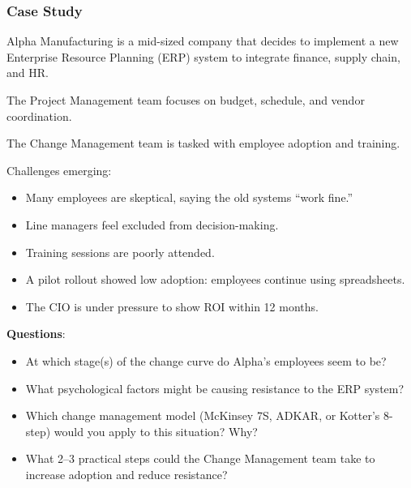 \subsubsection{Case Study}

\indent 

Alpha Manufacturing is a mid-sized company that decides to implement a new Enterprise Resource Planning (ERP) system to integrate finance, supply chain, and HR.

The Project Management team focuses on budget, schedule, and vendor 
coordination.

The Change Management team is tasked with employee adoption and 
training.

\noindent Challenges emerging:

\begin{itemize}
    \item Many employees are skeptical, saying the old systems “work fine.”
    \item Line managers feel excluded from decision-making.
    \item Training sessions are poorly attended.
    \item A pilot rollout showed low adoption: employees continue using spreadsheets.
    \item The CIO is under pressure to show ROI within 12 months.
\end{itemize}

\bigskip

\noindent\textbf{Questions}:

\begin{itemize}
    \item At which stage(s) of the change curve do Alpha’s employees seem to be?
    \item What psychological factors might be causing resistance to the ERP system?
    \item Which change management model (McKinsey 7S, ADKAR, or Kotter’s 8-step) would you apply to this situation? Why?
    \item What 2–3 practical steps could the Change Management team take to increase adoption and reduce resistance?
\end{itemize}